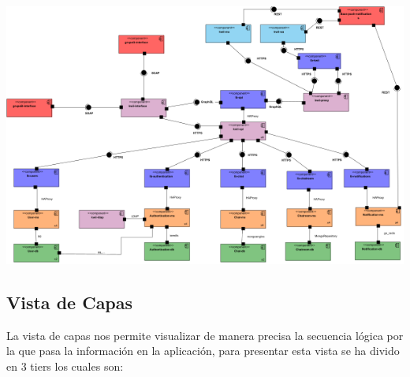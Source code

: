 \begin{center}
    \includegraphics[width=14cm]{Figures/P3/CYC.png}    
\end{center}

\subsection{Vista de Capas}
La vista de capas nos permite visualizar de manera precisa la secuencia lógica por la que pasa la información en la aplicación, para presentar esta vista se ha divido en 3 tiers los cuales son:\\


